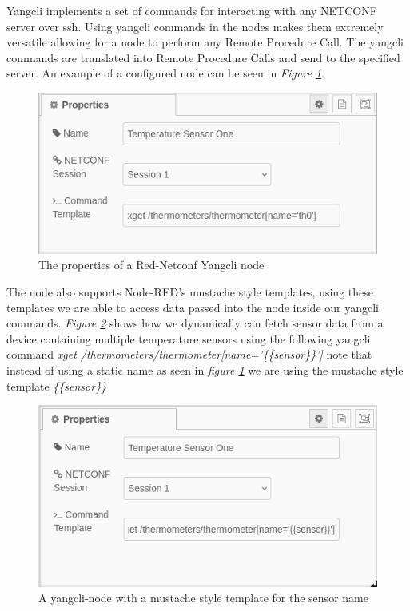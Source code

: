 \documentclass[12pt]{article}
\begin{document}
\newpage


Yangcli \cite{YumaYangcliManual} implements a set of commands for interacting with any NETCONF server over ssh. 
Using yangcli commands in the nodes makes them extremely versatile allowing for a node to perform any Remote Procedure Call. 
The yangcli commands are translated into Remote Procedure Calls and send to the specified server. An example 
of a configured node can be seen in \textit{Figure \ref{fig:yangcli-node}}.

\begin{figure}
  \centering
  \includegraphics[width=\textwidth]{yangcli-node-settings.png}
  \caption{The properties of a Red-Netconf Yangcli node}
  \label{fig:yangcli-node}
\end{figure}

\newpage

The node also supports Node-RED's mustache style templates, using these templates we are able to access data passed into the node
inside our yangcli commands. \textit{Figure \ref{fig:yangcli-node-template}} shows how we dynamically can fetch 
sensor data from a device containing multiple temperature sensors using the following 
yangcli command \textit{xget /thermometers/thermometer[name='\{\{sensor\}\}']} note that instead of using a 
static name as seen in \textit{figure \ref{fig:yangcli-node}} we are using the mustache style template 
\textit{\{\{sensor\}\}}

\begin{figure}
  \centering
  \includegraphics[width=\textwidth]{yangcli-node-settings-wildcard.png}
  \caption{A yangcli-node with a mustache style template for the sensor name}
  \label{fig:yangcli-node-template}
\end{figure}
\end{document}
